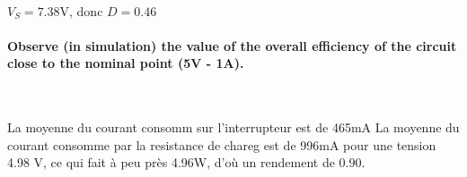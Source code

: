 \documentclass{article}
\begin{document}
~


$V_S=7.38$V, donc $D=0.46$


\paragraph{Observe (in simulation) the value of the overall efficiency of the circuit close to the nominal point (5V - 1A).}

~

La moyenne du courant consomm sur l’interrupteur est de 465mA
La moyenne du courant consomme par la resistance de chareg est de 996mA pour une tension 4.98 V, ce qui fait à peu près 4.96W, d’où un rendement de 0.90.
\end{document}
